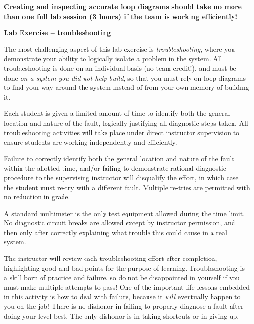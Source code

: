 \vskip 10pt

{\bf Creating and inspecting accurate loop diagrams should take no more than one full lab session (3 hours) if the team is working efficiently!}







\vfil \eject

\noindent
{\bf Lab Exercise -- troubleshooting}

\vskip 5pt

The most challenging aspect of this lab exercise is {\it troubleshooting}, where you demonstrate your ability to logically isolate a problem in the system.  All troubleshooting is done on an individual basis (no team credit!), and must be done {\it on a system you did not help build}, so that you must rely on loop diagrams to find your way around the system instead of from your own memory of building it.

Each student is given a limited amount of time to identify both the general location and nature of the fault, logically justifying all diagnostic steps taken.  All troubleshooting activities will take place under direct instructor supervision to ensure students are working independently and efficiently. 

Failure to correctly identify both the general location and nature of the fault within the allotted time, and/or failing to demonstrate rational diagnostic procedure to the supervising instructor will disqualify the effort, in which case the student must re-try with a different fault.  Multiple re-tries are permitted with no reduction in grade.

A standard multimeter is the only test equipment allowed during the time limit.  No diagnostic circuit breaks are allowed except by instructor permission, and then only after correctly explaining what trouble this could cause in a real system.  

The instructor will review each troubleshooting effort after completion, highlighting good and bad points for the purpose of learning.  Troubleshooting is a skill born of practice and failure, so do not be disappointed in yourself if you must make multiple attempts to pass!  One of the important life-lessons embedded in this activity is how to deal with failure, because it {\it will} eventually happen to you on the job!  There is no dishonor in failing to properly diagnose a fault after doing your level best.  The only dishonor is in taking shortcuts or in giving up.

